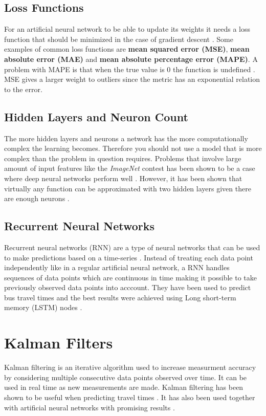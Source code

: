  \subsection{Loss Functions}
For an artificial neural network to be able to update its weights it needs a loss function that should be minimized in the case of gradient descent \cite{Goodfellow-et-al-2016}. Some examples of common loss functions are \textbf{mean squared error (MSE)}, \textbf{mean absolute error (MAE)} and \textbf{mean absolute percentage error (MAPE)}. A problem with MAPE is that when the true value is 0 the function is undefined \cite{MAPE}. MSE gives a larger weight to outliers since the metric has an exponential relation to the error.

\subsection{Hidden Layers and Neuron Count}
The more hidden layers and neurons a network has the more computationally complex the learning becomes. Therefore you should not use a model that is more complex than the problem in question requires. Problems that involve large amount of input features like the \textit{ImageNet} contest has been shown to be a case where deep neural networks perform well \cite{ImageNet}. However, it has been shown that virtually any function can be approximated with two hidden layers given there are enough neurons \cite{Demuth}.

\subsection{Recurrent Neural Networks}
Recurrent neural networks (RNN) are a type of neural networks that can be used to make predictions based on a time-series \cite{RNN}. Instead of treating each data point independently like in a regular artificial neural network, a RNN handles sequences of data points which are continuous in time making it possible to take previously observed data points into acccount. They have been used to predict bus travel times and the best results were achieved using Long short-term memory (LSTM) nodes \cite{RNNBusPredictions}.

\section{Kalman Filters}
Kalman filtering is an iterative algorithm used to increase measurment accuracy by considering multiple consecutive data points observed over time. It can be used in real time as new measurements are made. Kalman filtering has been shown to be useful when predicting travel times \cite{kalmanPrediction}. It has also been used together with artificial neural networks with promising results \cite{kalmanANN}.

